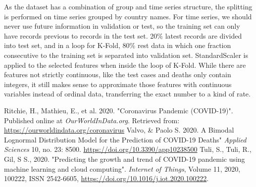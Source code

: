 \documentclass[12pt]{article}
\begin{document}
As the dataset has a combination of group and time series structure, the splitting is performed on time series grouped by country names. For time series,  we should never use future information in validation or test, so the training set can only have records previous to records in the test set. 20\%  latest records are divided into test set, and in a loop for K-Fold, 80\% rest data in which one fraction consecutive to the training set is separated into validation set. StandardScaler is applied to the selected features when inside the loop of K-Fold. While there are features not strictly continuous, like the test cases and deaths only contain integers, it still makes sense to approximate those features with continuous variables instead of ordinal data, transferring the exact number to a kind of rate. 

\newpage
\begin{thebibliography}{99}
	Ritchie, H., Mathieu, E., et al. 2020. "Coronavirus Pandemic (COVID-19)". Published online at {\em OurWorldInData.org}. Retrieved from: \url{https://ourworldindata.org/coronavirus}
	Valvo, \& Paolo S. 2020. A Bimodal Lognormal Distribution Model for the Prediction of COVID-19 Deaths" {\em Applied Sciences }10, no. 23: 8500. \url{https://doi.org/10.3390/app10238500}
	 Tuli, S., Tuli, R., Gil, S S., 2020. "Predicting the growth and trend of COVID-19 pandemic using machine learning and cloud computing". {\em Internet of Things},
	Volume 11,
	2020,
	100222,
	ISSN 2542-6605,
	\url{https://doi.org/10.1016/j.iot.2020.100222}.
\end{thebibliography}
	
\end{document}
